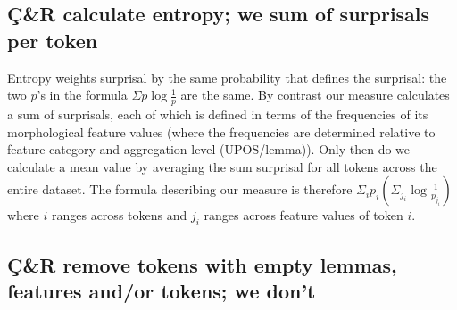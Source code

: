 \documentclass[USenglish]{article}
\begin{document}
\subsection{Ç\&R calculate entropy; we sum of surprisals per token}\label{appedix:differences_entropy_vs_surprisal}
Entropy weights surprisal by the same probability that defines the surprisal: the two $p$'s in the formula $\Sigma p\log{\frac{1}{p}}$ are the same.
By contrast our measure calculates a sum of surprisals, each of which is defined in terms of the frequencies of its morphological feature values (where the frequencies are determined relative to feature category and aggregation level (UPOS/lemma)).
Only then do we calculate a mean value by averaging the sum surprisal for all tokens across the entire dataset.
The formula describing our measure is therefore $\Sigma_i p_i \left( \Sigma_{j_i} \log{\frac{1}{p_{j_i}}} \right)$ where $i$ ranges across tokens and $j_i$ ranges across feature values of token $i$.


\subsection{Ç\&R remove tokens with empty lemmas, features and/or tokens; we don't}\label{appedix:differences_remove_empty_lemmas_tokens}
\end{document}
